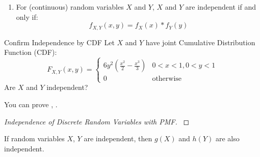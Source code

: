 	\begin{enumerate}[resume]		
		\item For (continuous) random variables $X$ and $Y$, $X$ and $Y$ are independent if and only if:
			\begin{equation} \label{eq:Independence of Multiple Continuous Random Variables Using PDF}
				f_{X,Y} \left( x,y \right) = f_{X} \left( x \right) * f_{Y} \left( y \right)
			\end{equation}
	\end{enumerate}
		\begin{example}{Confirm Independence by CDF}
			Let $X$ and $Y$ have joint Cumulative Distribution Function (CDF):
			\begin{equation*}
				F_{X,Y} \left( x,y \right) = \begin{cases}
					6y^{2} \left( \frac{x^{2}}{2} - \frac{x^{3}}{3} \right) & 0 < x < 1, 0 < y < 1 \\
					0 & \text{otherwise}
				\end{cases}
			\end{equation*}
			Are $X$ and $Y$ independent?
		\end{example}
	You can prove , .
	\begin{proof}[Independence of Discrete Random Variables with PMF] \label{proof:Independence of Discrete Random Variables with PMF}
		
	\end{proof}
	\begin{theorem} \label{thm:Independence of Random Functions}
		If random variables $X$, $Y$ are independent, then $g\left( X \right)$ and $h \left( Y \right)$ are also independent.
	\end{theorem}

